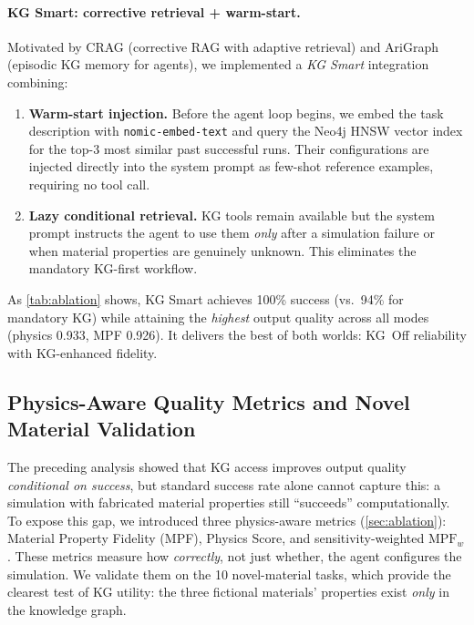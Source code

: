 \documentclass[twocolumn]{article}
\begin{document}
\paragraph{KG Smart: corrective retrieval + warm-start.}
Motivated by CRAG \citep{yan2024crag} (corrective RAG with adaptive
retrieval) and AriGraph \citep{arigraph2024} (episodic KG memory for
agents), we implemented a \emph{KG Smart} integration combining:
\begin{enumerate}
  \item \textbf{Warm-start injection.} Before the agent loop begins, we embed
        the task description with \texttt{nomic-embed-text} and query the Neo4j
        HNSW vector index for the top-3 most similar past successful runs.
        Their configurations are injected directly into the system prompt as
        few-shot reference examples, requiring no tool call.
  \item \textbf{Lazy conditional retrieval.} KG tools remain available but the
        system prompt instructs the agent to use them \emph{only}
        after a simulation failure or when material properties are genuinely
        unknown.  This eliminates the mandatory KG-first workflow.
\end{enumerate}

As \cref{tab:ablation} shows, KG Smart achieves 100\% success
(vs.\ 94\% for mandatory KG) while attaining the \emph{highest} output
quality across all modes (physics 0.933, MPF 0.926).  It delivers the
best of both worlds: KG~Off reliability with KG-enhanced fidelity.

\subsection{Physics-Aware Quality Metrics and Novel Material Validation}
\label{sec:novidium}

The preceding analysis showed that KG access improves output quality
\emph{conditional on success}, but standard success rate alone cannot
capture this: a simulation with fabricated material properties still
``succeeds'' computationally.  To expose this gap, we introduced three
physics-aware metrics (\cref{sec:ablation}): Material Property Fidelity
(MPF), Physics Score, and sensitivity-weighted $\text{MPF}_w$.  These
metrics measure how \emph{correctly}, not just whether, the agent
configures the simulation.  We validate them on the 10 novel-material
tasks, which provide the clearest test of KG utility: the three
fictional materials' properties exist \emph{only} in the knowledge graph.
\end{document}
